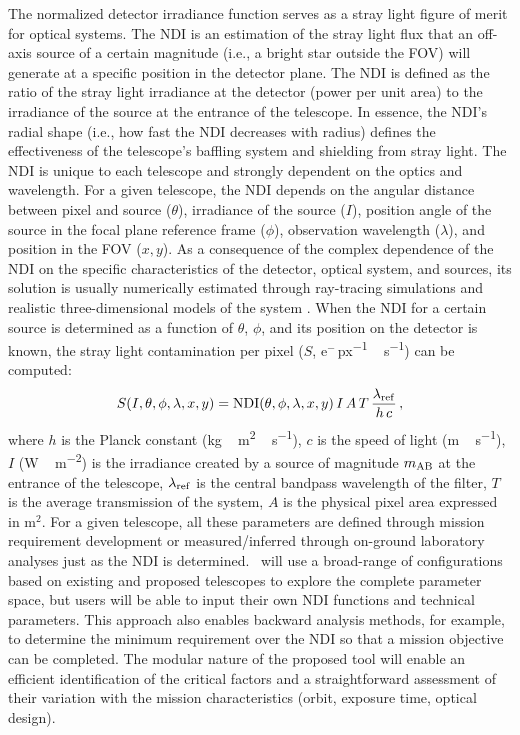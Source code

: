 \documentclass[usenames,dvipsnames,modern]{CLASS_FILES/aastex631}  %
\begin{document}
The normalized detector irradiance \citep[NDI,][]{bely2003book} function serves as a stray light figure of merit for optical systems. The NDI is an estimation of the stray light flux that an off-axis source of a certain magnitude (i.e., a bright star outside the FOV) will generate at a specific position in the detector plane. The NDI is defined as the ratio of the stray light irradiance at the detector (power per unit area) to the irradiance of the source at the entrance of the telescope. In essence, the NDI's radial shape (i.e., how fast the NDI decreases with radius) defines the effectiveness of the telescope's baffling system and shielding from stray light. The NDI is unique to each telescope and strongly dependent on the optics and wavelength. For a given telescope, the NDI depends on the angular distance between  pixel and  source ($\theta$), irradiance of the source ($I$),  position angle of the source in the focal plane reference frame ($\phi$), observation wavelength ($\lambda$), and position in the FOV ($x,y$). As a consequence of the complex dependence of the NDI on the specific characteristics of the detector, optical system, and sources, its solution is usually numerically estimated through ray-tracing simulations and realistic three-dimensional models of the system \citep[i.e., \texttt{ASAP},][]{turner2004inproceedings_333}. When the NDI for a certain source is determined as a function of $\theta$, $\phi$, and its position on the detector is known, the stray light contamination per pixel ($S$, e$^-$\,\si{{\rm px}^{-1}\,{\rm s}^{-1}}) can be computed:
%
\begin{equation}
\label{eq:straylight_estimation_3}
S(I,\theta,\phi,\lambda,x,y) = {\rm NDI}(\theta,\phi,\lambda,x,y)\,I\,A\,T\, \frac{\lambda_{\rm ref}}{h\,c} \,,
\end{equation}
where $h$ is the Planck constant (\si{kg\,m^2\,s^{-1}}), $c$ is the speed of light (\si{m\,s^{-1}}), $I$ (\si{W\,m^{-2}}) is the irradiance created by a source of magnitude $m_{\rm AB}$ at the entrance of the telescope, $\lambda_{\rm ref}$ is the central bandpass wavelength of the filter, $T$ is the average transmission of the system, $A$ is the physical pixel area expressed in m$^2$. For a given telescope, all these parameters are defined through mission requirement development or measured/inferred through on-ground laboratory analyses just as the NDI is determined. \MyName\ will use a broad-range of configurations based on existing and proposed telescopes to explore the complete parameter space, but users will be able to input their own NDI functions and technical parameters. This approach also enables backward analysis methods, for example, to determine the minimum requirement over the NDI so that a mission objective can be completed. The modular nature of the proposed tool will enable an efficient identification of the critical factors and a straightforward assessment of their variation with the mission characteristics (orbit, exposure time, optical design).\\
\end{document}
